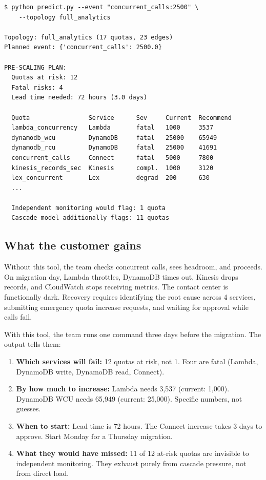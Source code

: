 \documentclass{article}
\begin{document}
\begin{verbatim}
$ python predict.py --event "concurrent_calls:2500" \
    --topology full_analytics

Topology: full_analytics (17 quotas, 23 edges)
Planned event: {'concurrent_calls': 2500.0}

PRE-SCALING PLAN:
  Quotas at risk: 12
  Fatal risks: 4
  Lead time needed: 72 hours (3.0 days)

  Quota                Service      Sev     Current  Recommend
  lambda_concurrency   Lambda       fatal   1000     3537
  dynamodb_wcu         DynamoDB     fatal   25000    65949
  dynamodb_rcu         DynamoDB     fatal   25000    41691
  concurrent_calls     Connect      fatal   5000     7800
  kinesis_records_sec  Kinesis      compl.  1000     3120
  lex_concurrent       Lex          degrad  200      630
  ...

  Independent monitoring would flag: 1 quota
  Cascade model additionally flags: 11 quotas
\end{verbatim}

\subsection{What the customer gains}

Without this tool, the team checks concurrent calls, sees headroom, and proceeds. On migration day, Lambda throttles, DynamoDB times out, Kinesis drops records, and CloudWatch stops receiving metrics. The contact center is functionally dark. Recovery requires identifying the root cause across 4 services, submitting emergency quota increase requests, and waiting for approval while calls fail.

With this tool, the team runs one command three days before the migration. The output tells them:

\begin{enumerate}
  \item \textbf{Which services will fail:} 12 quotas at risk, not 1. Four are fatal (Lambda, DynamoDB write, DynamoDB read, Connect).
  \item \textbf{By how much to increase:} Lambda needs 3,537 (current: 1,000). DynamoDB WCU needs 65,949 (current: 25,000). Specific numbers, not guesses.
  \item \textbf{When to start:} Lead time is 72 hours. The Connect increase takes 3 days to approve. Start Monday for a Thursday migration.
  \item \textbf{What they would have missed:} 11 of 12 at-risk quotas are invisible to independent monitoring. They exhaust purely from cascade pressure, not from direct load.
\end{enumerate}
\end{document}
